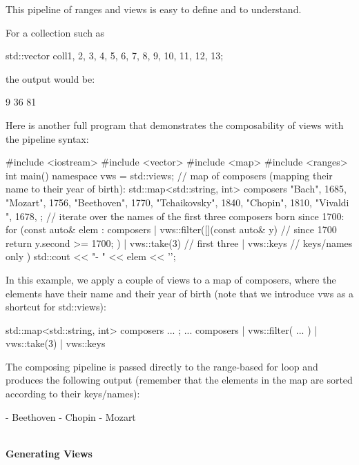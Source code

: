 This pipeline of ranges and views is easy to define and to understand.

For a collection such as

\begin{cpp}
std::vector coll{1, 2, 3, 4, 5, 6, 7, 8, 9, 10, 11, 12, 13};
\end{cpp}

the output would be:

\begin{shell}
9 36 81
\end{shell}

Here is another full program that demonstrates the composability of views with the pipeline syntax:


\begin{cpp}
#include <iostream>
#include <vector>
#include <map>
#include <ranges>
int main()
{
	namespace vws = std::views;
	// map of composers (mapping their name to their year of birth):
	std::map<std::string, int> composers{
		{"Bach", 1685},
		{"Mozart", 1756},
		{"Beethoven", 1770},
		{"Tchaikovsky", 1840},
		{"Chopin", 1810},
		{"Vivaldi ", 1678},
	};
	// iterate over the names of the first three composers born since 1700:
	for (const auto& elem : composers
		| vws::filter([](const auto& y) { // since 1700
			return y.second >= 1700;
		})
		| vws::take(3) // first three
		| vws::keys // keys/names only
	) {
		std::cout << "- " << elem << '\n';
	}
}
\end{cpp}

In this example, we apply a couple of views to a map of composers, where the elements have their name and their year of birth (note that we introduce vws as a shortcut for std::views):

\begin{cpp}
std::map<std::string, int> composers{ ... };
...
composers
	| vws::filter( ... )
	| vws::take(3)
	| vws::keys
\end{cpp}

The composing pipeline is passed directly to the range-based for loop and produces the following output (remember that the elements in the map are sorted according to their keys/names):

\begin{shell}
- Beethoven
- Chopin
- Mozart
\end{shell}

\noindent
\hspace*{\fill} \\ %
\textbf{Generating Views}

